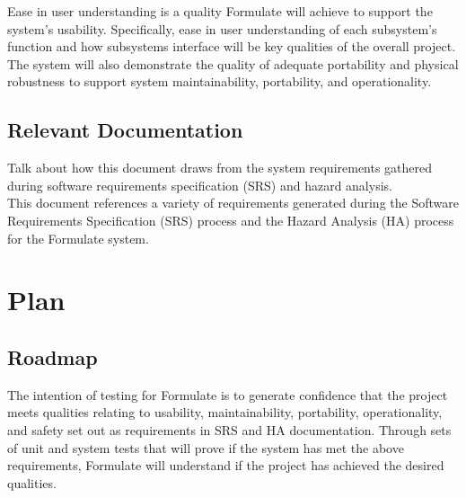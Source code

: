 \documentclass[12pt, titlepage]{article}
\begin{document}
  Ease in user understanding is a quality Formulate will achieve to support the system's usability.  Specifically, ease in user understanding of each subsystem's function and how subsystems interface will be key qualities of the overall project.\\

  The system will also demonstrate the quality of adequate portability and physical robustness to support system maintainability, portability, and operationality.\\



\subsection{Relevant Documentation}


  Talk about how this document draws from the system requirements gathered during software requirements specification (SRS) and hazard analysis.\\

  This document references a variety of requirements generated during the Software Requirements Specification (SRS) process and the Hazard Analysis (HA) process for the Formulate system. \\


\newpage
\section{Plan}

  
  \subsection{Roadmap}

  The intention of testing for Formulate is to generate confidence that the project meets qualities relating to usability, maintainability, portability, operationality, and safety set out as requirements in SRS and HA documentation. Through sets of unit and system tests that will prove if the system has met the above requirements, Formulate will understand if the project has achieved the desired qualities.\\
\end{document}

